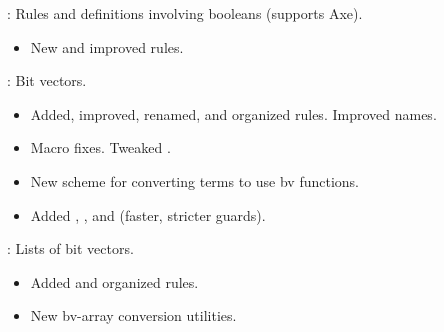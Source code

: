 
\begin{frame}

\implibtitle

:
Rules and definitions involving booleans (supports Axe).
\begin{itemize}
\item New and improved rules.
\end{itemize}

\end{frame}


\begin{frame}

\implibtitle

:
Bit vectors.
\begin{itemize}
\item Added, improved, renamed, and organized rules.  Improved names.
\item Macro fixes.  Tweaked .
\item New scheme for converting terms to use bv functions.
\item Added , , and  (faster, stricter guards).
\end{itemize}

\end{frame}


\begin{frame}

\implibtitle

:
Lists of bit vectors.
\begin{itemize}
\item Added and organized rules.
\item New bv-array conversion utilities.
\end{itemize}

\end{frame}



